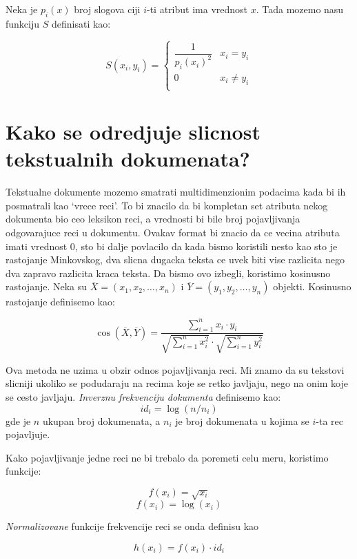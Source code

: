 \documentclass[a4paper]{article}
\begin{document}
 Neka je \(p_i(x)\) broj slogova ciji \(i\)-ti atribut ima vrednost \(x\). Tada mozemo nasu funkciju
 \(S\) definisati kao:

 \[
    S(x_i, y_i) =
    \begin{cases}
        \dfrac{1}{p_i(x_i)^2} & x_i = y_i \\
        0 & x_i \neq y_i \\
    \end{cases}
 \]

\section{Kako se odredjuje slicnost tekstualnih dokumenata?}
\label{pitanje:slicnost_tekst_dokumenata}

Tekstualne dokumente mozemo smatrati multidimenzionim podacima kada bi ih posmatrali kao `vrece
reci'. To bi znacilo da bi kompletan set atributa nekog dokumenta bio ceo leksikon reci, a vrednosti
bi bile broj pojavljivanja odgovarajuce reci u dokumentu. Ovakav format bi znacio da ce vecina
atributa imati vrednost 0, sto bi dalje povlacilo da kada bismo koristili nesto kao sto je
rastojanje Minkovskog, dva slicna dugacka teksta ce uvek biti vise razlicita nego dva zapravo
razlicita kraca teksta. Da bismo ovo izbegli, koristimo kosinusno rastojanje. Neka su
\(\overline{X}=(x_1,x_2,\ldots,x_n)\) i \(\overline{Y}=(y_1,y_2,\ldots,y_n)\) objekti. Kosinusno
rastojanje definisemo kao:

\[
    \cos(\overline{X}, \overline{Y}) =
    \dfrac{\sum_{i=1}^{n} x_i \cdot y_i}{\sqrt{\sum_{i=1}^{n} x_i^2} \cdot \sqrt{\sum_{i=1}^{n} y_i^2}}
\]

Ova metoda ne uzima u obzir odnos pojavljivanja reci. Mi znamo da su tekstovi slicniji ukoliko se
podudaraju na recima koje se retko javljaju, nego na onim koje se cesto javljaju. \emph{Inverznu
frekvenciju dokumenta} definisemo kao:
\begin{equation}\label{eq:inverzna_funkcija_dokumenta}
    id_i = \log(n/n_i)
\end{equation}
gde je \(n\) ukupan broj dokumenata, a \(n_i\) je broj dokumenata u kojima se \(i\)-ta rec
pojavljuje.

Kako pojavljivanje jedne reci ne bi trebalo da poremeti celu meru, koristimo funkcije:

\[f(x_i) = \sqrt{x_i}\]
\[f(x_i) = \log(x_i)\]

\emph{Normalizovane} funkcije frekvencije reci se onda definisu kao

\[h(x_i) = f(x_i) \cdot id_i\]
\end{document}
